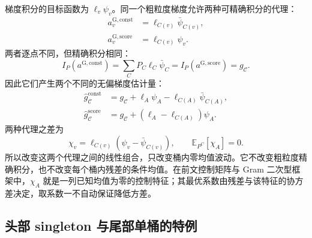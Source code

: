\documentclass[lang=cn,scheme=chinese,openany]{../book/elegantbook}
\newcommand{\E}{\mathbb E}
\begin{document}
梯度积分的目标函数为 $\ell_v\psi_v$。同一个粗粒度梯度允许两种可精确积分的代理：
\begin{align*}
 a^{\mathrm{G,const}}_v&=\ell_{C(v)}\bar\psi_{C(v)},\\
 a^{\mathrm{G,score}}_v&=\ell_{C(v)}\psi_v.
\end{align*}
两者逐点不同，但精确积分相同：
\begin{equation*}
 I_P(a^{\mathrm{G,const}})
 =\sum_CP_C\ell_C\bar \psi_C
 =I_P(a^{\mathrm{G,score}})=g_{\mathcal C}.
\end{equation*}
因此它们产生两个不同的无偏梯度估计量：
\begin{align}
 \widehat g_{\mathcal C}^{\mathrm{const}}
 &=g_{\mathcal C}+\ell_A\psi_A-\ell_{C(A)}\bar\psi_{C(A)},
 \label{inf:eq:kl-partition-constant-estimator}\\
 \widehat g_{\mathcal C}^{\mathrm{score}}
 &=g_{\mathcal C}+(\ell_A-\ell_{C(A)})\psi_A.
 \label{inf:eq:kl-partition-score-estimator}
\end{align}
两种代理之差为
\begin{equation*}
 \chi_v=\ell_{C(v)}(\psi_v-\bar\psi_{C(v)}),
 \qquad \E_{P^C}[\chi_A]=0.
\end{equation*}
所以改变这两个代理之间的线性组合，只改变桶内零均值波动。它不改变粗粒度精确积分，也不改变每个桶内残差的条件均值。在前文控制矩阵与 Gram 二次型框架中，$\chi_A$ 就是一列已知均值为零的控制特征；其最优系数由残差与该特征的协方差决定，取系数一不自动保证降低方差。

\subsection{头部 singleton 与尾部单桶的特例}
\end{document}
